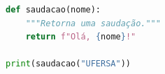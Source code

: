 \label{ap:C}

% 

\begin{lstlisting}[language=Python,caption={Exemplo de código-fonte em Python}]
def saudacao(nome):
    """Retorna uma saudação."""
    return f"Olá, {nome}!"

print(saudacao("UFERSA"))
\end{lstlisting}
